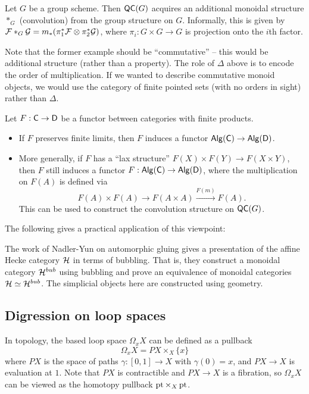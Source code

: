 \documentclass{article}
\begin{document}
\begin{ex}
	Let $G$ be a group scheme.
	Then $\mathsf{QC}(G)$ acquires an additional monoidal structure $*_G$ (convolution) from the group structure on $G$.
	Informally, this is given by $\mathcal{F} *_G \mathcal{G} = m_*(\pi_1^* \mathcal{F} \otimes \pi_2^* \mathcal{G})$, where $\pi_i: G \times G \to G$ is projection onto the $i$th factor.
\end{ex}

Note that the former example should be ``commutative'' -- this would be additional structure (rather than a property).
The role of $\Delta$ above is to encode the order of multiplication.
If we wanted to describe commutative monoid objects, we would use the category of finite pointed sets (with no orders in sight) rather than $\Delta$.

\begin{rmk}
	Let $F: \mathsf{C} \to \mathsf{D}$ be a functor between categories with finite products.
	\begin{itemize}
		\item If $F$ preserves finite limits, then $F$ induces a functor $\mathsf{Alg}(\mathsf{C}) \to \mathsf{Alg}(\mathsf{D})$.
		\item More generally, if $F$ has a ``lax structure'' $F(X) \times F(Y) \to F(X \times Y)$, then $F$ still induces a functor $F: \mathsf{Alg}(\mathsf{C}) \to \mathsf{Alg}(\mathsf{D})$, where the multiplication on $F(A)$ is defined via
			\[
				F(A) \times F(A) \to F(A \times A) \xrightarrow{F(m)} F(A).
			\]
			This can be used to construct the convolution structure on $\mathsf{QC}(G)$.
			\end{itemize}
\end{rmk}

The following gives a practical application of this viewpoint:

\begin{ex}
	The work of Nadler-Yun on automorphic gluing gives a presentation of the affine Hecke category $\mathcal{H}$ in terms of bubbling.
	That is, they construct a monoidal category $\mathcal{H}^{bub}$ using bubbling and prove an equivalence of monoidal categories $\mathcal{H} \simeq \mathcal{H}^{bub}$.
	The simplicial objects here are constructed using geometry.
\end{ex}

\subsection{Digression on loop spaces}

In topology, the based loop space $\Omega_x X$ can be defined as a pullback
\[
	\Omega_x X  = PX \times_X \{ x \}
\]
where $PX$ is the space of paths $\gamma: [0, 1] \to X$ with $\gamma(0) = x$, and $PX \to X$ is evaluation at $1$.
Note that $PX$ is contractible and $PX \to X$ is a fibration, so $\Omega_x X$ can be viewed as the homotopy pullback $\operatorname{pt} \times_X \operatorname{pt}$.
\end{document}
